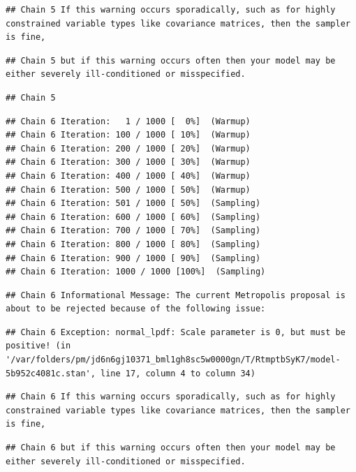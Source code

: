 \documentclass[
]{book}
\begin{document}
\begin{verbatim}
## Chain 5 If this warning occurs sporadically, such as for highly constrained variable types like covariance matrices, then the sampler is fine,
\end{verbatim}

\begin{verbatim}
## Chain 5 but if this warning occurs often then your model may be either severely ill-conditioned or misspecified.
\end{verbatim}

\begin{verbatim}
## Chain 5
\end{verbatim}

\begin{verbatim}
## Chain 6 Iteration:   1 / 1000 [  0%]  (Warmup) 
## Chain 6 Iteration: 100 / 1000 [ 10%]  (Warmup) 
## Chain 6 Iteration: 200 / 1000 [ 20%]  (Warmup) 
## Chain 6 Iteration: 300 / 1000 [ 30%]  (Warmup) 
## Chain 6 Iteration: 400 / 1000 [ 40%]  (Warmup) 
## Chain 6 Iteration: 500 / 1000 [ 50%]  (Warmup) 
## Chain 6 Iteration: 501 / 1000 [ 50%]  (Sampling) 
## Chain 6 Iteration: 600 / 1000 [ 60%]  (Sampling) 
## Chain 6 Iteration: 700 / 1000 [ 70%]  (Sampling) 
## Chain 6 Iteration: 800 / 1000 [ 80%]  (Sampling) 
## Chain 6 Iteration: 900 / 1000 [ 90%]  (Sampling) 
## Chain 6 Iteration: 1000 / 1000 [100%]  (Sampling)
\end{verbatim}

\begin{verbatim}
## Chain 6 Informational Message: The current Metropolis proposal is about to be rejected because of the following issue:
\end{verbatim}

\begin{verbatim}
## Chain 6 Exception: normal_lpdf: Scale parameter is 0, but must be positive! (in '/var/folders/pm/jd6n6gj10371_bml1gh8sc5w0000gn/T/RtmptbSyK7/model-5b952c4081c.stan', line 17, column 4 to column 34)
\end{verbatim}

\begin{verbatim}
## Chain 6 If this warning occurs sporadically, such as for highly constrained variable types like covariance matrices, then the sampler is fine,
\end{verbatim}

\begin{verbatim}
## Chain 6 but if this warning occurs often then your model may be either severely ill-conditioned or misspecified.
\end{verbatim}
\end{document}
